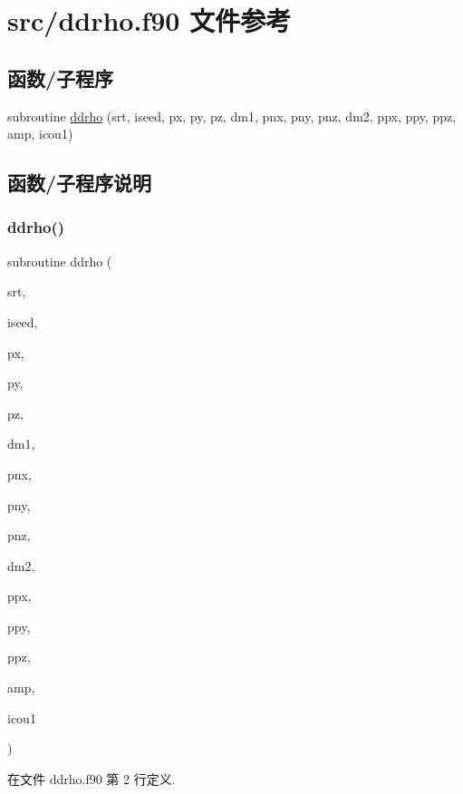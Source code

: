 \hypertarget{ddrho_8f90}{}\section{src/ddrho.f90 文件参考}
\label{ddrho_8f90}
\subsection*{函数/子程序}
\begin{DoxyCompactItemize}
\item 
subroutine \mbox{\hyperlink{ddrho_8f90_ac4d063e7ac9b1c02dcc08327ff355246}{ddrho}} (srt, iseed, px, py, pz, dm1, pnx, pny, pnz, dm2, ppx, ppy, ppz, amp, icou1)
\end{DoxyCompactItemize}


\subsection{函数/子程序说明}
\mbox{\label{ddrho_8f90_ac4d063e7ac9b1c02dcc08327ff355246}} 
\subsubsection{\texorpdfstring{ddrho()}{ddrho()}}
{\footnotesize\ttfamily subroutine ddrho (\begin{DoxyParamCaption}\item[{}]{srt,  }\item[{}]{iseed,  }\item[{}]{px,  }\item[{}]{py,  }\item[{}]{pz,  }\item[{}]{dm1,  }\item[{}]{pnx,  }\item[{}]{pny,  }\item[{}]{pnz,  }\item[{}]{dm2,  }\item[{}]{ppx,  }\item[{}]{ppy,  }\item[{}]{ppz,  }\item[{}]{amp,  }\item[{}]{icou1 }\end{DoxyParamCaption})}



在文件 ddrho.\+f90 第 2 行定义.

